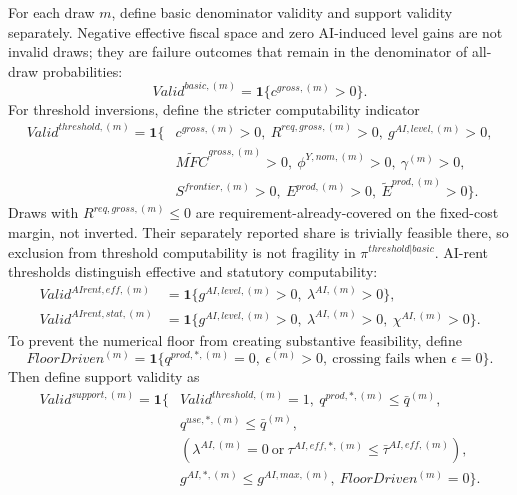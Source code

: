 \documentclass[11pt,a4paper]{article}
\begin{document}
For each draw $m$, define basic denominator validity and support validity separately. Negative effective fiscal space and zero AI-induced level gains are not invalid draws; they are failure outcomes that remain in the denominator of all-draw probabilities:
\begin{equation}
    Valid^{basic,(m)}=\mathbf{1}\{c^{gross,(m)}>0\}.
\end{equation}
For threshold inversions, define the stricter computability indicator
\begin{equation}\label{eq:valid_threshold_operational_v25}
\begin{split}
    Valid^{threshold,(m)}=\mathbf{1}\{&c^{gross,(m)}>0,
    \ R^{req,gross,(m)}>0,
    \ g^{AI,level,(m)}>0,\\
    &\widetilde{MFC}^{gross,(m)}>0,
    \ \phi^{Y,nom,(m)}>0,
    \ \gamma^{(m)}>0,\\
    &S^{frontier,(m)}>0,
    \ E^{prod,(m)}>0,
    \ \tilde E^{prod,(m)}>0\}.
\end{split}
\end{equation}
Draws with $R^{req,gross,(m)}\leq0$ are requirement-already-covered on the fixed-cost margin, not inverted. Their separately reported share is trivially feasible there, so exclusion from threshold computability is not fragility in $\pi^{threshold|basic}$. AI-rent thresholds distinguish effective and statutory computability:
\begin{align}
    Valid^{AIrent,eff,(m)}
    &=\mathbf{1}\{g^{AI,level,(m)}>0,\ \lambda^{AI,(m)}>0\},\\
    Valid^{AIrent,stat,(m)}
    &=\mathbf{1}\{g^{AI,level,(m)}>0,\ \lambda^{AI,(m)}>0,\ \chi^{AI,(m)}>0\}.
\end{align}
To prevent the numerical floor from creating substantive feasibility, define
\begin{equation}\label{eq:floor_driven_operational_v25}
    FloorDriven^{(m)}=\mathbf{1}\{q^{prod,*,(m)}=0,\ \epsilon^{(m)}>0,\ \text{crossing fails when }\epsilon=0\}.
\end{equation}
Then define support validity as
\begin{equation}
\begin{split}
    Valid^{support,(m)}=\mathbf{1}\{&Valid^{threshold,(m)}=1,
    \ q^{prod,*,(m)}\leq\bar q^{(m)},\\
    &q^{use,*,(m)}\leq\bar q^{(m)},\\
    &\left(\lambda^{AI,(m)}=0\ \text{or}\ \tau^{AI,eff,*,(m)}\leq\bar\tau^{AI,eff,(m)}\right),\\
    &g^{AI,*,(m)}\leq g^{AI,max,(m)},
    \ FloorDriven^{(m)}=0\}.
\end{split}
\end{equation}
\end{document}
